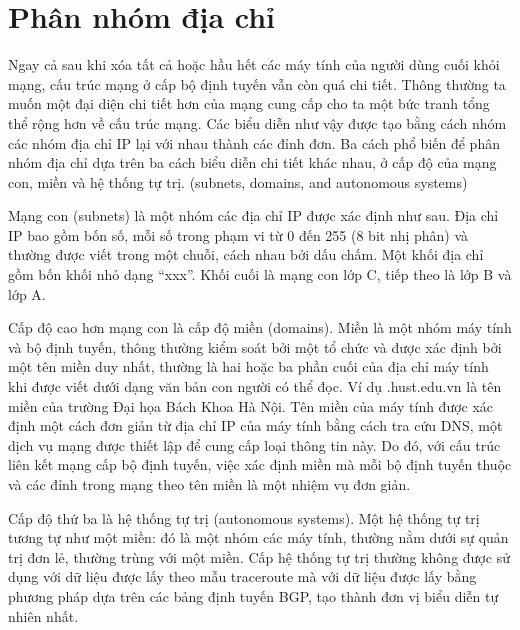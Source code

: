 \section{Phân nhóm địa chỉ}
Ngay cả sau khi xóa tất cả hoặc hầu hết các máy tính của người dùng cuối khỏi mạng, cấu trúc mạng ở cấp bộ định tuyến vẫn còn quá chi tiết. Thông thường ta muốn một đại diện chi tiết hơn của mạng cung cấp cho ta một bức tranh tổng thể rộng hơn về cấu trúc mạng. Các biểu diễn như vậy được tạo bằng cách nhóm các nhóm địa chỉ IP lại với nhau thành các đỉnh đơn. Ba cách phổ biến để phân nhóm địa chỉ dựa trên ba cách biểu diễn chi tiết khác nhau, ở cấp độ của mạng con, miền và hệ thống tự trị. (subnets, domains, and autonomous systems)\par
Mạng con (subnets) là một nhóm các địa chỉ IP được xác định như sau. Địa chỉ IP bao gồm bốn số, mỗi số trong phạm vi từ 0 đến 255 (8 bit nhị phân) và thường được viết trong một chuỗi, cách nhau bởi dấu chấm. Một khối địa chỉ gồm bốn khối nhỏ dạng “xxx”. Khối cuối là mạng con lớp C, tiếp theo là lớp B và lớp A.\par
Cấp độ cao hơn mạng con là cấp độ miền (domains). Miền là một nhóm máy tính và bộ định tuyến, thông thường kiểm soát bởi một tổ chức và được xác định bởi một tên miền duy nhất, thường là hai hoặc ba phần cuối của địa chỉ máy tính khi được viết dưới dạng văn bản con người có thể đọc. Ví dụ .hust.edu.vn là tên miền của trường Đại họa Bách Khoa Hà Nội. Tên miền của máy tính được xác định một cách đơn giản từ địa chỉ IP của máy tính bằng cách tra cứu DNS, một dịch vụ mạng được thiết lập để cung cấp loại thông tin này. Do đó, với cấu trúc liên kết mạng cấp bộ định tuyến, việc xác định miền mà mỗi bộ định tuyến thuộc và các đỉnh trong mạng theo tên miền là một nhiệm vụ đơn giản.\par
Cấp độ thứ ba là hệ thống tự trị (autonomous systems). Một hệ thống tự trị tương tự như một miền: đó là một nhóm các máy tính, thường nằm dưới sự quản trị đơn lẻ, thường trùng với một miền. Cấp hệ thống tự trị thường không được sử dụng với dữ liệu được lấy theo mẫu traceroute mà với dữ liệu được lấy bằng phương pháp dựa trên các bảng định tuyến BGP, tạo thành đơn vị biểu diễn tự nhiên nhất.\par

